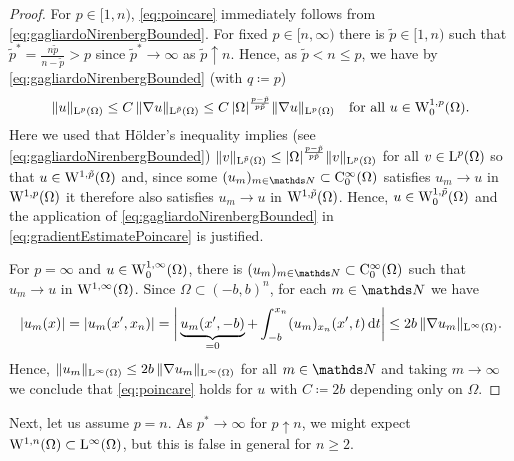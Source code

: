 \begin{proof}
  For $p \in [1,n)$, \eqref{eq:poincare} immediately follows from \eqref{eq:gagliardoNirenbergBounded}. For fixed $p \in [n, \infty)$ there is $\tilde p \in [1,n)$ such that $\tilde p^* = \frac{n \tilde p}{n - \tilde p} > p$ since $\tilde p^* \to \infty$ as $\tilde p \uparrow n$.
    Hence, as $\tilde p < n \leq p$, we have by \eqref{eq:gagliardoNirenbergBounded} (with $q \coloneqq p$)
    \begin{equation}
      \label{eq:gradientEstimatePoincare}
      \|u\|_{\mathrm{L}^p(\Omega)} 
      \leq C \, \|\nabla u\|_{\mathrm{L}^{\tilde p}(\Omega)}
      \leq C \, |\Omega|^{\frac{p - \tilde p}{p \tilde p}} \|\nabla u\|_{\mathrm{L}^p(\Omega)} \quad\text{for all } u \in \mathrm{W}_0^{1,p}(\Omega).
    \end{equation}
    Here we used that Hölder's inequality implies (see \eqref{eq:gagliardoNirenbergBounded}) $\|v\|_{\mathrm{L}^{\tilde p}(\Omega)} \leq |\Omega|^{\frac{p - \tilde p}{p \tilde p}} \|v\|_{\mathrm{L}^p(\Omega)}$ for all $v \in \mathrm{L}^p(\Omega)$ so that $u \in \mathrm{W}^{1,\tilde p}(\Omega)$ and, since some $(u_m)_{m \in \N} \subset \CC_0^\infty(\Omega)$ satisfies $u_m \to u$ in $\mathrm{W}^{1,p}(\Omega)$ it therefore also satisfies $u_m \to u$ in $\mathrm{W}^{1,\tilde p}(\Omega)$.
    Hence, $u \in \mathrm{W}_0^{1,\tilde p}(\Omega)$ and the application of \eqref{eq:gagliardoNirenbergBounded} in \eqref{eq:gradientEstimatePoincare} is justified.

    For $p = \infty$ and $u \in \mathrm{W}_0^{1,\infty}(\Omega)$, there is $(u_m)_{m \in \N} \subset \CC_0^\infty(\Omega)$ such that $u_m \to u$ in $\mathrm{W}^{1,\infty}(\Omega)$.
    Since $\Omega \subset (-b,b)^n$, for each $m \in \N$ we have
    $$
    |u_m(x)| 
    = | u_m(x',x_n)|
    = \bigg|\underbrace{u_m(x', -b)}_{= 0} + \int_{-b}^{x_n} (u_m)_{x_n} (x',t)\, {\operatorname{d}\!{t}} \bigg|
    \leq 2b \, \|\nabla u_m \|_{\mathrm{L}^\infty(\Omega)}.
    $$
    Hence, $\|u_m\|_{\mathrm{L}^\infty(\Omega)} \leq 2b \, \|\nabla u_m\|_{\mathrm{L}^\infty(\Omega)}$ for all $m \in \N$ and taking $m \to \infty$ we conclude that \eqref{eq:poincare} holds for $u$ with $C \coloneqq 2b$ depending only on $\Omega$.
\end{proof}

Next, let us assume $p = n$.
As $p^* \to \infty$ for $p \uparrow n$, we might expect $\mathrm{W}^{1,n}(\Omega) \subset \mathrm{L}^\infty(\Omega)$, but this is false in general for $n \geq 2$.

